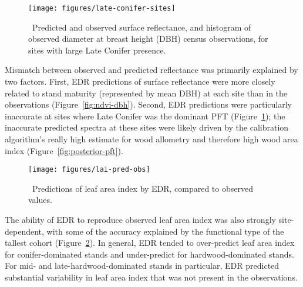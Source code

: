\begin{figure}[ht]
  \centering
  \texttt{[image: figures/late-conifer-sites]}
  \caption{\label{fig:late-conifer-sites}\
    Predicted and observed surface reflectance, and histogram of observed diameter at breast height (DBH) census observations,
    for sites with large Late Conifer presence.
  }
\end{figure}

Mismatch between observed and predicted reflectance was primarily explained by two factors.
First, EDR predictions of surface reflectance were more closely related to stand maturity (represented by mean DBH) at each site than in the observations (Figure~\ref{fig:ndvi-dbh}).
Second, EDR predictions were particularly inaccurate at sites where Late Conifer was the dominant PFT (Figure~\ref{fig:late-conifer-sites});
the inaccurate predicted spectra at these sites were likely driven by the calibration algorithm's really high estimate for wood allometry and therefore high wood area index (Figure~\ref{fig:posterior-pft}).


\begin{figure}
  \centering
  \texttt{[image: figures/lai-pred-obs]}
  \caption{\
    Predictions of leaf area index by EDR, compared to observed values.
  }\label{fig:lai-pred-obs}
\end{figure}

The ability of EDR to reproduce observed leaf area index was also strongly site-dependent, with some of the accuracy explained by the functional type of the tallest cohort (Figure~\ref{fig:lai-pred-obs}).
In general, EDR tended to over-predict leaf area index for conifer-dominated stands and under-predict for hardwood-dominated stands.
For mid- and late-hardwood-dominated stands in particular, EDR predicted substantial variability in leaf area index that was not present in the observations.

